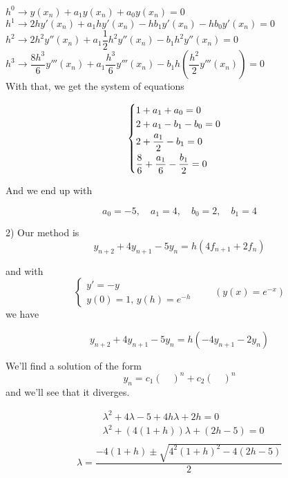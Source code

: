 \begin{example}
    $h^0 \longrightarrow y(x_n) + a_1y(x_n) + a_0y(x_n) = 0$ \\
    
    $h^1 \longrightarrow 2hy'(x_n) + a_1hy'(x_n) - hb_1y'(x_n) - hb_0y'(x_n) = 0$ \\
    
    $h^2 \longrightarrow 2h^2y''(x_n) + a_1\dfrac{1}{2}h^2y''(x_n) - b_1h^2y''(x_n) = 0$\\
    
    $h^3 \longrightarrow \dfrac{8h^3}{6}y'''(x_n) + a_1\dfrac{h^3}{6}y'''(x_n) - b_1h\left(\dfrac{h^2}{2}y'''(x_n)\right) = 0$ \\
    
    With that, we get the system of equations
    
    $$
      \begin{cases}
        1 + a_1 + a_0 = 0\\
        2 + a_1 - b_1 - b_0 = 0 \vspace{0.1cm}\\
        2 + \dfrac{a_1}{2} - b_1 = 0 \vspace{0.1cm}\\
        \dfrac{8}{6} + \dfrac{a_1}{6} - \dfrac{b_1}{2} = 0
      \end{cases}
    $$
    
    And we end up with
    
    \[
      a_0 = -5, \quad a_1 = 4, \quad b_0 = 2, \quad b_1 = 4
    \]
    
    \vspace{1cm}
    
    2)  Our method is 
    $$y_{n+2} + 4y_{n+1} - 5y_n = h(4f_{n+1} + 2f_n)$$
    
    and with $$\begin{cases}y' = -y \\y(0) = 1, \, y(h) = e^{-h} \end{cases} \qquad (y(x) = e^{-x})$$ we have
    
    \[
      y_{n+2} + 4y_{n+1} - 5y_n = h(-4y_{n+1} - 2y_n)
    \]
    
    We'll find a solution of the form $$y_n = c_1(\quad)^n + c_2(\quad)^n$$ and we'll see that it diverges.
    
    \begin{align*}
      &\lambda^2 + 4\lambda - 5 + 4h\lambda + 2h = 0\\
      &\lambda^2 + (4(1+h))\lambda + (2h-5) = 0\\
    \end{align*}
    \[
      \lambda = \frac{-4(1+h) \pm \sqrt{4^2(1+h)^2 - 4(2h-5)}}{2}
    \]
    

\end{example}
